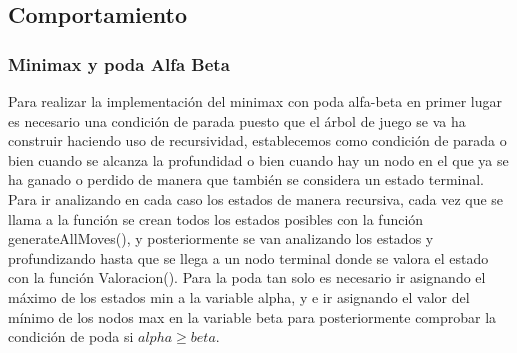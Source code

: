 \documentclass[a4paper, 10pt]{article} %
\begin{document}
\subsection{Comportamiento}
\subsubsection{Minimax y poda Alfa Beta}
Para realizar la implementación del minimax con poda alfa-beta en primer lugar es necesario una condición de parada puesto que el árbol de juego se va ha construir haciendo uso de recursividad, establecemos como condición de parada o bien cuando se alcanza la profundidad o bien cuando hay un nodo en el que ya se ha ganado o perdido de manera que también se considera un estado terminal. Para ir analizando en cada caso los estados de manera recursiva, cada vez que se llama a la función se crean todos los estados posibles con la función generateAllMoves(), y posteriormente se van analizando los estados y profundizando hasta que se llega a un nodo terminal donde se valora el estado con la función Valoracion(). Para la poda tan solo es necesario ir asignando el máximo de los estados min a la variable alpha, y e ir asignando el valor del mínimo de los nodos max en la variable beta para posteriormente comprobar la condición de poda si $alpha \geq beta$.
\end{document}
